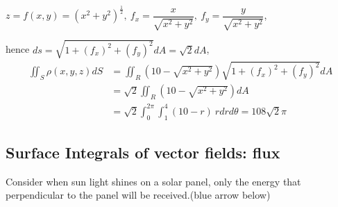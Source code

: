 \documentclass[11pt, a4paper]{MATH2023}
\begin{document}
\begin{spacing}{1.3}
    $z=f(x,y)=(x^2+y^2)^{\frac{1}{2}},\ f_x=\dfrac{x}{\sqrt{x^2+y^2}},\ f_y=\dfrac{y}{\sqrt{x^2+y^2}}$,

    hence $ds=\sqrt{1+(f_x)^2+(f_y)^2}dA=\sqrt{2} dA$,
    \begin{align*}
        \iint_S \rho(x,y,z) dS &= \iint_R \left(10-\sqrt{x^2+y^2}\right)\sqrt{1+(f_x)^2+(f_y)^2}dA\\
         &= \sqrt{2} \iint_R (10-\sqrt{x^2+y^2}) dA\\
         &= \sqrt{2} \int_0^{2\pi} \int_1^4 (10-r)\ r dr d\theta = 108\sqrt{2} \pi
    \end{align*}

    \newpage
    \subsection{Surface Integrals of vector fields: flux}
    
    Consider when sun light shines on a solar panel, only the energy that 
    perpendicular to the panel will be received.(blue arrow below)
    \begin{center}
        \begin{tikzpicture}[x=0.75pt,y=0.75pt,yscale=-1,xscale=1]


\end{tikzpicture}
\end{center}
\end{spacing}
\end{document}
